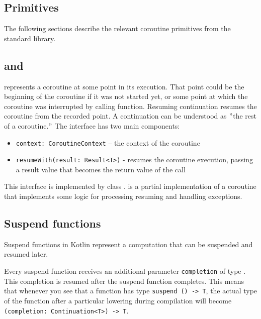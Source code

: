 \subsection{Primitives}

The following sections describe the relevant coroutine primitives from the standard library.

\subsection*{\Continuation and \CoroutineImpl}

 represents a coroutine at some point in its execution. That point could be the beginning
of the coroutine if it was not started yet, or some point at which the coroutine was interrupted by calling
\suspendCoroutineUninterceptedOrReturn function. Resuming continuation resumes the coroutine from the recorded point.
A continuation can be understood as \("\)the rest of a coroutine.\("\) The interface has
two main components:

\begin{itemize}
    \item \texttt{context: CoroutineContext} – the context of the coroutine
    \item \texttt{resumeWith(result: Result<T>)} - resumes the coroutine execution, passing a result value that becomes
    the return value of the \suspendCoroutineUninterceptedOrReturn call
\end{itemize}

This interface is implemented by class \CoroutineImpl. \CoroutineImpl is a partial implementation of a coroutine that
implements some logic for processing resuming and handling exceptions.

\subsection*{Suspend functions}
\label{subsec:suspend-funs}

Suspend functions in Kotlin represent a computation that can be suspended and resumed later.

Every suspend function receives an additional parameter \texttt{completion}
of type \Continuation. This completion is resumed after the suspend function
completes. This means that whenever you see that a function has type \texttt{suspend () -> T}, the actual type
of the function after a particular lowering during compilation will become \texttt{(completion: Continuation<T>) -> T}.

